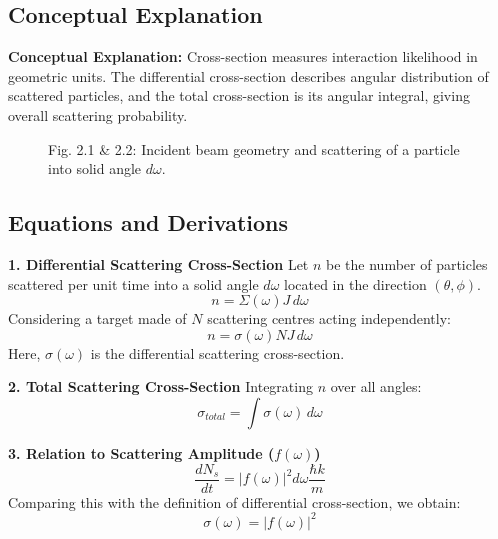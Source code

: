 \documentclass[12pt]{report}
\begin{document}
\subsection{Conceptual Explanation}
\textbf{Conceptual Explanation:} Cross-section measures interaction likelihood in geometric units. The differential cross-section describes angular distribution of scattered particles, and the total cross-section is its angular integral, giving overall scattering probability.


\begin{figure}[H]
    \centering
    
    
    \vspace{0.8cm} %
    
    
    
    \caption{Fig. 2.1 \& 2.2: Incident beam geometry and scattering of a particle into solid angle $d\omega$.} 
    \label{fig:cross_section_geometry}
\end{figure}


\subsection*{Equations and Derivations}
\textbf{1. Differential Scattering Cross-Section} Let $n$ be the number of particles scattered per unit time into a solid angle $d\omega$ located in the direction $(\theta, \phi)$.
\begin{equation}
n = \Sigma(\omega) J \, d\omega
 \end{equation}
Considering a target made of $N$ scattering centres acting independently:
\begin{equation}
n = \sigma(\omega) N J \, d\omega
\end{equation}
Here, $\sigma(\omega)$ is the differential scattering cross-section.

\textbf{2. Total Scattering Cross-Section} Integrating $n$ over all angles:
\begin{equation}
\sigma_{total} = \int \sigma(\omega) \, d\omega
\end{equation}

\textbf{3. Relation to Scattering Amplitude ($f(\omega)$)}
\begin{equation}
\frac{dN_s}{dt} = |f(\omega)|^2 d\omega \frac{\hbar k}{m}
\end{equation}
Comparing this with the definition of differential cross-section, we obtain:
\begin{equation}
\sigma(\omega) = |f(\omega)|^2
\end{equation}
\end{document}
